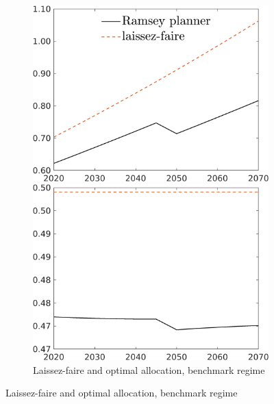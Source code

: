 \begin{figure}[h!!]
	\centering
	\caption{Allocations in levels }\label{fig:LF}	
	\begin{subfigure}{1\textwidth}		
		\caption{Laissez-faire and optimal allocation, benchmark regime}
	\begin{minipage}[]{0.32\textwidth}
		\includegraphics[width=1\textwidth]{../../codding_model/own_basedOnFried/optimalPol_010922_revision/figures/all_13Sept22_Tplus30/C_LFCompOPT_T_NoTaus_regime0_spillover0_noskill0_sep0_xgrowth0_PV1_etaa0.79_lgd1.png}
	\end{minipage}	
	\begin{minipage}[]{0.32\textwidth}
	\includegraphics[width=1\textwidth]{../../codding_model/own_basedOnFried/optimalPol_010922_revision/figures/all_13Sept22_Tplus30/hh_LFCompOPT_T_NoTaus_regime0_spillover0_noskill0_sep0_xgrowth0_PV1_etaa0.79_lgd0.png}

\end{minipage}
\end{subfigure}
\end{figure}
